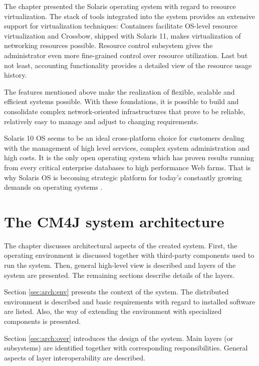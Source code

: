\documentclass[11pt,openany]{book}
\begin{document}
      The chapter presented the Solaris operating system with regard to resource virtualization. The stack of tools
      integrated into the system provides an extensive support for virtualization techniques: Containers facilitate
      OS-level resource virtualization and Crossbow, shipped with Solaris 11, makes virtualization of networking
      resources possible. Resource control subsystem gives the administrator even more fine-grained control over
      resource utilization. Last but not least, accounting functionality provides a detailed view of the resource usage
      history.

      The features mentioned above make the realization of flexible, scalable and efficient systems possible. With these
      foundations, it is possible to build and consolidate complex network-oriented infrastructures that prove to be
      reliable, relatively easy to manage and adjust to changing requirements.

      Solaris 10 OS seems to be an ideal cross-platform choice for customers dealing with the management of high level
      services, complex system administration and high costs. It is the only open operating system which has proven
      results running from every critical enterprise databases to high performance Web farms. That is why Solaris OS is
      becoming strategic platform for today's constantly growing demands on operating systems
      \cite{solaris_operating_system}. 


  \chapter{The CM4J system architecture}
  \label{chap:arch}

    The chapter discusses architectural aspects of the created system. First, the operating environment is discussed
    together with third-party components used to run the system. Then, general high-level view is described and
    layers of the system are presented. The remaining sections describe details of the layers.

    Section \ref{sec:arch:env} presents the context of the system. The distributed environment is described and
    basic requirements with regard to installed software are listed. Also, the way of extending the environment with
    specialized components is presented.

    Section \ref{sec:arch:over} introduces the design of the system. Main layers (or subsystems) are identified together
    with corresponding responsibilities. General aspects of layer interoperability are described.
\end{document}

